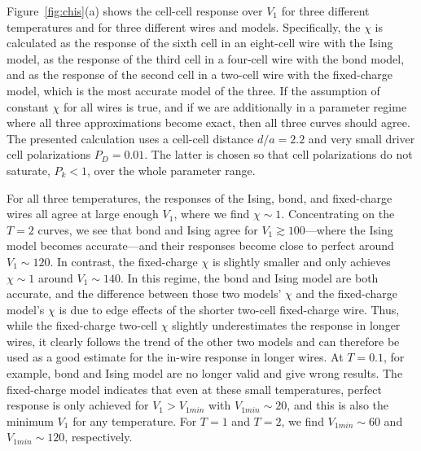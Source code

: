 Figure~\ref{fig:chis}(a) shows the cell-cell response over $V_1$ for three
different temperatures and for three different wires and models. Specifically,
the $\chi$ is calculated as the response of the sixth cell in an eight-cell wire
with the Ising model, as the response of the third cell in a four-cell wire with
the bond model, and as the response of the second cell in a two-cell wire with
the fixed-charge model, which is the most accurate model of the three. If the
assumption of constant $\chi$ for all wires is true, and if we are additionally
in a parameter regime where all three approximations become exact, then all
three curves should agree. The presented calculation uses a cell-cell distance
$d/a = 2.2$ and very small driver cell polarizations $P_D = 0.01$. The latter is
chosen so that cell polarizations do not saturate, $P_k < 1$, over the whole
parameter range.

For all three temperatures, the responses of the Ising, bond, and fixed-charge
wires all agree at large enough $V_1$, where we find $\chi \sim 1$.
Concentrating on the $T = 2$ curves, we see that bond and Ising agree for $V_1
\gtrsim 100$---where the Ising model becomes accurate---and their responses
become close to perfect around $V_1 \sim 120$. In contrast, the fixed-charge
$\chi$ is slightly smaller and only achieves $\chi \sim 1$ around $V_1 \sim
140$. In this regime, the bond and Ising model are both accurate, and the
difference between those two models' $\chi$ and the fixed-charge model's $\chi$
is due to edge effects of the shorter two-cell fixed-charge wire. Thus, while
the fixed-charge two-cell $\chi$ slightly underestimates the response in longer
wires, it clearly follows the trend of the other two models and can therefore be
used as a good estimate for the in-wire response in longer wires. At $T = 0.1$,
for example, bond and Ising model are no longer valid and give wrong results.
The fixed-charge model indicates that even at these small temperatures, perfect
response is only achieved for $V_1 > V_{1min}$ with $V_{1min} \sim 20$, and this
is also the minimum $V_1$ for any temperature. For $T = 1$ and $T = 2$, we find
$V_{1min} \sim 60$ and $V_{1min} \sim 120$, respectively.


